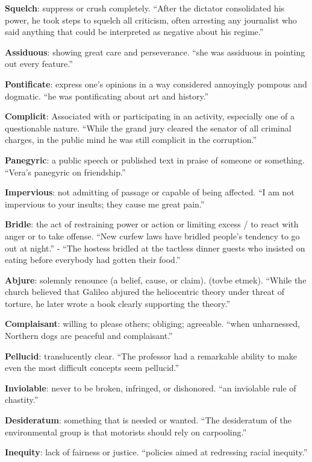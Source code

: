 \documentclass[12pt, a4paper]{ximera}
\begin{document}
\textbf{Squelch}: suppress or crush completely. ``After the dictator consolidated his power, he took steps to squelch all criticism, often arresting any journalist who said anything that could be interpreted as negative about his regime.''

\textbf{Assiduous}: showing great care and perseverance. ``she was assiduous in pointing out every feature.''

\textbf{Pontificate}: express one's opinions in a way considered annoyingly pompous and dogmatic. ``he was pontificating about art and history.''

\textbf{Complicit}: Associated with or participating in an activity, especially one of a questionable nature. ``While the grand jury cleared the senator of all criminal charges, in the public mind he was still complicit in the corruption.''

\textbf{Panegyric}: a public speech or published text in praise of someone or something. ``Vera's panegyric on friendship.''

\textbf{Impervious}: not admitting of passage or capable of being affected. ``I am not impervious to your insults; they cause me great pain.''

\textbf{Bridle}: the act of restraining power or action or limiting excess / to react with anger or to take offense. ``New curfew laws have bridled people's tendency to go out at night.'' - ``The hostess bridled at the tactless dinner guests who insisted on eating before everybody had gotten their food.''

\textbf{Abjure}: solemnly renounce (a belief, cause, or claim). (tovbe etmek). ``While the church believed that Galileo abjured the heliocentric theory under threat of torture, he later wrote a book clearly supporting the theory.''

\textbf{Complaisant}: willing to please others; obliging; agreeable. ``when unharnessed, Northern dogs are peaceful and complaisant.''

\textbf{Pellucid}: translucently clear. ``The professor had a remarkable ability to make even the most difficult concepts seem pellucid.''

\textbf{Inviolable}: never to be broken, infringed, or dishonored. ``an inviolable rule of chastity.''

\textbf{Desideratum}: something that is needed or wanted. ``The desideratum of the environmental group is that motorists should rely on carpooling.''

\textbf{Inequity}: lack of fairness or justice. ``policies aimed at redressing racial inequity.''
\end{document}
